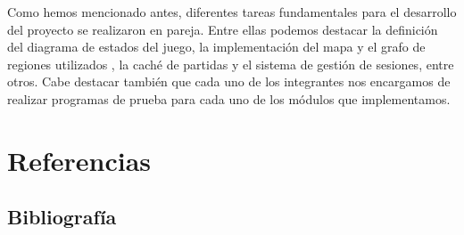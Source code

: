 \documentclass[11pt, a4paper, titlepage]{article}
\begin{document}
Como hemos mencionado antes, diferentes tareas fundamentales para el desarrollo del proyecto se realizaron en pareja. Entre ellas podemos destacar la definición del diagrama de estados del juego, la implementación del mapa y el grafo de regiones utilizados , la caché de partidas y el sistema de gestión de sesiones, entre otros. Cabe destacar también que cada uno de los integrantes nos encargamos de realizar programas de prueba para cada uno de los módulos que implementamos.


\clearpage

\newpage
\section{Referencias}
\subsection{Bibliografía}
\printbibliography
\end{document}
